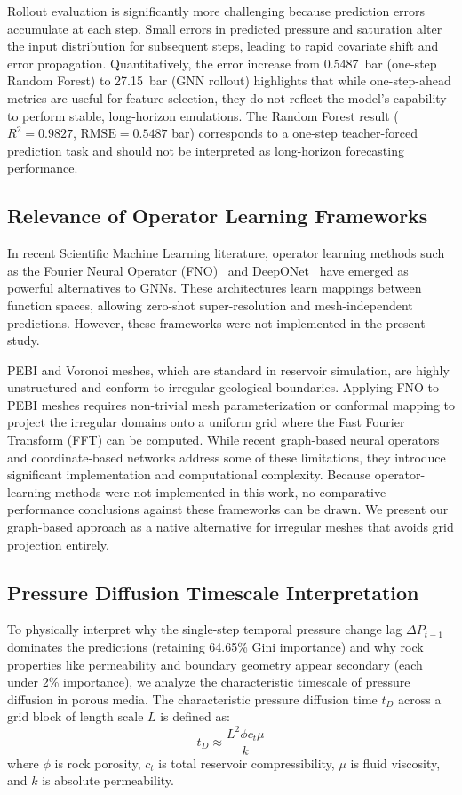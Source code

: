\documentclass[10pt,twocolumn]{article}
\begin{document}
Rollout evaluation is significantly more challenging because prediction errors accumulate at each step. Small errors in predicted pressure and saturation alter the input distribution for subsequent steps, leading to rapid covariate shift and error propagation. Quantitatively, the error increase from 0.5487~bar (one-step Random Forest) to 27.15~bar (GNN rollout) highlights that while one-step-ahead metrics are useful for feature selection, they do not reflect the model's capability to perform stable, long-horizon emulations. The Random Forest result ($R^2 = 0.9827$, $\text{RMSE} = 0.5487$ bar) corresponds to a one-step teacher-forced prediction task and should not be interpreted as long-horizon forecasting performance.

\subsection{Relevance of Operator Learning Frameworks}
In recent Scientific Machine Learning literature, operator learning methods such as the Fourier Neural Operator (FNO)~\cite{li2020fno} and DeepONet~\cite{lu2021deeponet} have emerged as powerful alternatives to GNNs. These architectures learn mappings between function spaces, allowing zero-shot super-resolution and mesh-independent predictions. However, these frameworks were not implemented in the present study.

PEBI and Voronoi meshes, which are standard in reservoir simulation, are highly unstructured and conform to irregular geological boundaries. Applying FNO to PEBI meshes requires non-trivial mesh parameterization or conformal mapping to project the irregular domains onto a uniform grid where the Fast Fourier Transform (FFT) can be computed. While recent graph-based neural operators and coordinate-based networks address some of these limitations, they introduce significant implementation and computational complexity. Because operator-learning methods were not implemented in this work, no comparative performance conclusions against these frameworks can be drawn. We present our graph-based approach as a native alternative for irregular meshes that avoids grid projection entirely.

\subsection{Pressure Diffusion Timescale Interpretation}
To physically interpret why the single-step temporal pressure change lag $\Delta P_{t-1}$ dominates the predictions (retaining 64.65\% Gini importance) and why rock properties like permeability and boundary geometry appear secondary (each under 2\% importance), we analyze the characteristic timescale of pressure diffusion in porous media. The characteristic pressure diffusion time $t_D$ across a grid block of length scale $L$ is defined as:
\begin{equation}
t_D \approx \frac{L^2 \phi c_t \mu}{k}
\label{eq:diffusion_time}
\end{equation}
where $\phi$ is rock porosity, $c_t$ is total reservoir compressibility, $\mu$ is fluid viscosity, and $k$ is absolute permeability. 
\end{document}
